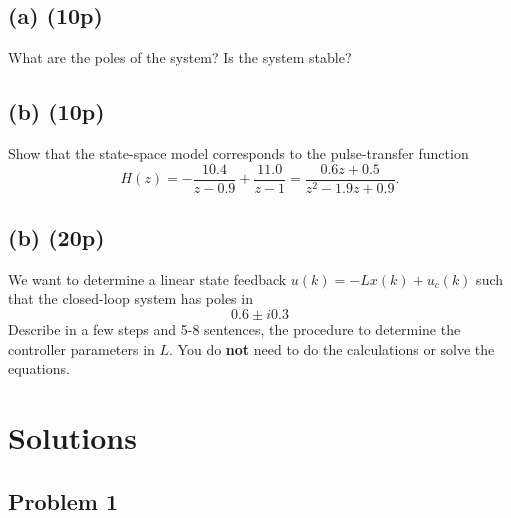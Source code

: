 \documentclass[a4paper]{scrartcl}
\begin{document}
\subsection*{(a) (10p)}
\label{sec-3-1}
What are the poles of the system? Is the system stable?

\subsection*{(b) (10p)}
\label{sec-3-2}
Show that the state-space model corresponds to the pulse-transfer function
\[ H(z) = -\frac{10.4}{z-0.9} + \frac{11.0}{z-1} = \frac{0.6z + 0.5}{z^2 - 1.9z + 0.9}. \]
\subsection*{(b) (20p)}
\label{sec-3-3}
We want to determine a linear state feedback $u(k) = -Lx(k) + u_c(k)$ such that the closed-loop system has poles in \[ 0.6 \pm i0.3 \] Describe in a few steps and 5-8 sentences, the procedure to determine the controller parameters in $L$. You do \textbf{not} need to do the calculations or solve the equations. 


\section*{Solutions}
\label{sec-4}
\subsection*{Problem 1}
\label{sec-4-1}
\end{document}
